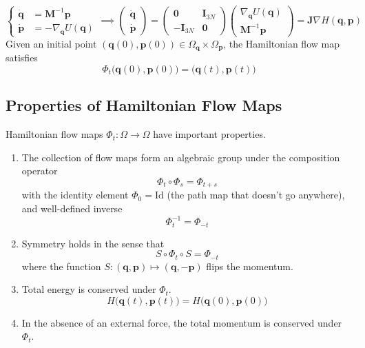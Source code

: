     \begin{equation}
      \begin{cases} \boldsymbol{\dot{q}} & = \mathbf{M}^{-1} \mathbf{p} \\
      \boldsymbol{\dot{p}} & = - \nabla_\mathbf{q} U(\mathbf{q}) \end{cases} \implies \begin{pmatrix} \boldsymbol{\dot{q}} \\ \boldsymbol{\dot{p}} \end{pmatrix} = \begin{pmatrix} \mathbf{0} & \mathbf{I}_{3N} \\ -\mathbf{I}_{3N} & \mathbf{0} \end{pmatrix} \begin{pmatrix} \nabla_\mathbf{q} U (\mathbf{q})\\ \mathbf{M}^{-1} \mathbf{p} \end{pmatrix} = \mathbf{J} \nabla H(\mathbf{q}, \mathbf{p})
    \end{equation}
    Given an initial point $(\mathbf{q}(0), \mathbf{p}(0)) \in \Omega_{\mathbf{q}} \times \Omega_{\mathbf{p}}$, the Hamiltonian flow map satisfies 
    \begin{equation}
      \Phi_t \big( \mathbf{q}(0), \mathbf{p}(0) \big) = \big(\mathbf{q}(t), \mathbf{p}(t)\big)
    \end{equation}

  \subsection{Properties of Hamiltonian Flow Maps}

    Hamiltonian flow maps $\Phi_t : \Omega \to \Omega$ have important properties. 
    \begin{enumerate}
        \item The collection of flow maps form an algebraic group under the composition operator
        \begin{equation}
          \Phi_t \circ \Phi_s = \Phi_{t + s}
        \end{equation}
        with the identity element $\Phi_0 = \mathrm{Id}$ (the path map that doesn't go anywhere), and well-defined inverse 
        \begin{equation}
          \Phi_t^{-1} = \Phi_{-t}
        \end{equation}
        \item Symmetry holds in the sense that 
        \begin{equation}
          S \circ \Phi_t \circ S = \Phi_{-t}
        \end{equation}
        where the function $S: (\mathbf{q}, \mathbf{p}) \mapsto (\mathbf{q}, -\mathbf{p})$ flips the momentum. 
        \item Total energy is conserved under $\Phi_t$. 
        \begin{equation}
          H\big( \mathbf{q}(t), \mathbf{p}(t) \big) = H\big( \mathbf{q}(0), \mathbf{p}(0) \big)
        \end{equation}
        \item In the absence of an external force, the total momentum is conserved under $\Phi_t$. 
    \end{enumerate}

